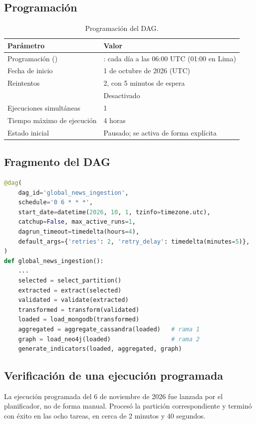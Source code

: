 \documentclass[11pt,a4paper]{article}
\newcommand{\code}[1]{\detokenize{#1}}
\begin{document}
\subsection{Programación}

\begin{table}[H]
\centering
\small
\begin{tabular}{@{}ll@{}}
\toprule
Parámetro & Valor \\
\midrule
Programación (\code{schedule}) & \code{0 6 * * *}: cada día a las 06:00 UTC (01:00 en Lima) \\
Fecha de inicio & 1 de octubre de 2026 (UTC) \\
Reintentos & 2, con 5 minutos de espera \\
\code{catchup} & Desactivado \\
Ejecuciones simultáneas & 1 \\
Tiempo máximo de ejecución & 4 horas \\
Estado inicial & Pausado; se activa de forma explícita \\
\bottomrule
\end{tabular}
\caption{Programación del DAG.}
\end{table}

\subsection{Fragmento del DAG}

\begin{lstlisting}[language=Python]
@dag(
    dag_id='global_news_ingestion',
    schedule='0 6 * * *',
    start_date=datetime(2026, 10, 1, tzinfo=timezone.utc),
    catchup=False, max_active_runs=1,
    dagrun_timeout=timedelta(hours=4),
    default_args={'retries': 2, 'retry_delay': timedelta(minutes=5)},
)
def global_news_ingestion():
    ...
    selected = select_partition()
    extracted = extract(selected)
    validated = validate(extracted)
    transformed = transform(validated)
    loaded = load_mongodb(transformed)
    aggregated = aggregate_cassandra(loaded)   # rama 1
    graph = load_neo4j(loaded)                 # rama 2
    generate_indicators(loaded, aggregated, graph)
\end{lstlisting}

\subsection{Verificación de una ejecución programada}

La ejecución programada del 6 de noviembre de 2026 fue lanzada por el planificador, no de forma manual. Procesó la partición correspondiente y terminó con éxito en las ocho tareas, en cerca de 2 minutos y 40 segundos.
\end{document}

